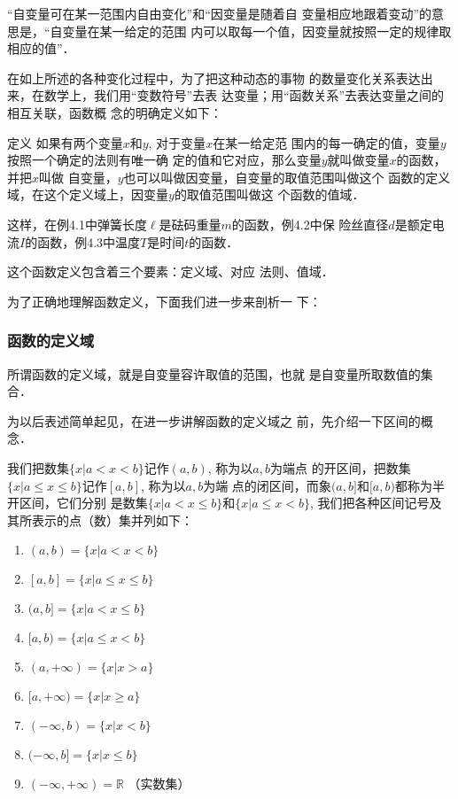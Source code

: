 “自变量可在某一范围内自由变化”和“因变量是随着自
变量相应地跟着变动”的意思是，“自变量在某一给定的范围
内可以取每一个值，因变量就按照一定的规律取相应的值”．

在如上所述的各种变化过程中，为了把这种动态的事物
的数量变化关系表达出来，在数学上，我们用“变数符号”去表
达变量；用“函数关系”去表达变量之间的相互关联，函数概
念的明确定义如下：

\begin{blk}{定义 }
    如果有两个变量$x$和$y$, 对于变量$x$在某一给定范
围内的每一确定的值，变量$y$按照一个确定的法则有唯一确
定的值和它对应，那么变量$y$就叫做变量$x$的函数，并把$x$叫做
自变量，$y$也可以叫做因变量，自变量的取值范围叫做这个
函数的定义域，在这个定义域上，因变量$y$的取值范围叫做这
个函数的值域．
\end{blk}


这样，在例4.1中弹簧长度$\ell$是砝码重量$m$的函数，例4.2中保
险丝直径$d$是额定电流$I$的函数，例4.3中温度$T$是时间$t$的函数．

这个函数定义包含着三个要素：定义域、对应
法则、值域．

为了正确地理解函数定义，下面我们进一步来剖析一
下：

\subsubsection{函数的定义域}
所谓函数的定义域，就是自变量容许取值的范围，也就
是自变量所取数值的集合．

为以后表述简单起见，在进一步讲解函数的定义域之
前，先介绍一下区间的概念．

我们把数集$\{x|a<x<b\}$记作$(a,b)$, 称为以$a,b$为端点
的开区间，把数集$\{x|a\le x\le b\}$记作$[a,b]$, 称为以$a,b$为端
点的闭区间，而象$(a,b]$和$[a,b)$都称为半开区间，它们分别
是数集$\{x|a<x\le b\}$和$\{x|a\le x<b\}$, 我们把各种区间记号及
其所表示的点（数）集并列如下：
\begin{multicols}{2}
    \begin{enumerate}
    \item $(a,b)=\{x|a<x<b\}$
    \item $ [a,b]=\{x|a\le x\le b\}$
    \item $(a,b]=\{x|a<x\le b\}$
    \item $[a,b)=\{x|a\le x<b\}$
    \item $(a,+\infty)=\{x|x>a\}$
    \item $[a,+\infty)=\{x|x\ge a\}$
    \item $(-\infty,b)=\{x|x<b\}$
    \item $(-\infty,b]=\{x|x\le b\}$
    \item $(-\infty,+\infty)=\mathbb{R}$ （实数集）
\end{enumerate}
\end{multicols}

